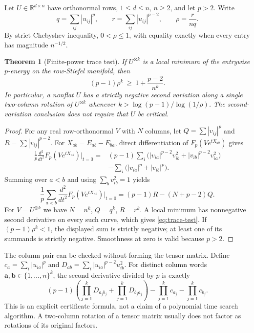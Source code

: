 \documentclass[11pt]{article}
\newtheorem{theorem}{Theorem}[section]
\begin{document}
Let $U\in\mathbb R^{d\times n}$ have orthonormal rows, $1\le d\le n$,
$n\ge2$, and let $p>2$. Write
\[
 q=\sum_{ij}|u_{ij}|^p,\qquad r=\sum_{ij}|u_{ij}|^{p-2},
 \qquad \rho=\frac{r}{nq}.
\]
By strict Chebyshev inequality, $0<\rho\le1$, with equality exactly
when every entry has magnitude $n^{-1/2}$.

\begin{theorem}[Finite-power trace test]\label{thm:trace-test}
If $U^{\otimes k}$ is a local minimum of the entrywise $p$-energy on
the row-Stiefel manifold, then
\begin{equation}\label{eq:trace-test}
 (p-1)\rho^k\ \ge\ 1+\frac{p-2}{n^k}.
\end{equation}
In particular, a nonflat $U$ has a strictly negative second variation
along a single two-column rotation of $U^{\otimes k}$ whenever
$k>\log(p-1)/\log(1/\rho)$. The second-variation conclusion does not
require that $U$ be critical.
\end{theorem}

\begin{proof}
For any real row-orthonormal $V$ with $N$ columns, let
$Q=\sum |v_{ij}|^p$ and $R=\sum |v_{ij}|^{p-2}$. For
$X_{ab}=E_{ab}-E_{ba}$, direct differentiation of
$F_p(Ve^{tX_{ab}})$ gives
\begin{align*}
 \frac1p\frac{d^2}{dt^2}F_p(Ve^{tX_{ab}})\bigg|_{t=0}
 ={}&(p-1)\sum_i\bigl(|v_{ia}|^{p-2}v_{ib}^2
               +|v_{ib}|^{p-2}v_{ia}^2\bigr)\\
 &-\sum_i\bigl(|v_{ia}|^p+|v_{ib}|^p\bigr).
\end{align*}
Summing over $a<b$ and using $\sum_bv_{ib}^2=1$ yields
\begin{equation}\label{eq:curvature-trace}
 \frac1p\sum_{a<b}\frac{d^2}{dt^2}F_p(Ve^{tX_{ab}})\bigg|_{t=0}
   =(p-1)R-(N+p-2)Q.
\end{equation}
For $V=U^{\otimes k}$ we have $N=n^k$, $Q=q^k$, $R=r^k$.
A local minimum has nonnegative second derivative on every such
curve, which gives \eqref{eq:trace-test}. If
$(p-1)\rho^k<1$, the displayed sum is strictly negative; at least one
of its summands is strictly negative. Smoothness at zero is valid
because $p>2$.
\end{proof}

The column pair can be checked without forming the tensor matrix.
Define $c_a=\sum_i|u_{ia}|^p$ and
$D_{ab}=\sum_i|u_{ia}|^{p-2}u_{ib}^2$. For distinct column words
$\mathbf a,\mathbf b\in\{1,\ldots,n\}^k$, the second derivative divided
by $p$ is exactly
\[
 (p-1)\left(\prod_{j=1}^kD_{a_jb_j}
             +\prod_{j=1}^kD_{b_ja_j}\right)
       -\prod_{j=1}^kc_{a_j}-\prod_{j=1}^kc_{b_j}.
\]
This is an explicit certificate formula, not a claim of a polynomial
time search algorithm. A two-column rotation of a tensor matrix
usually does not factor as rotations of its original factors.
\end{document}
